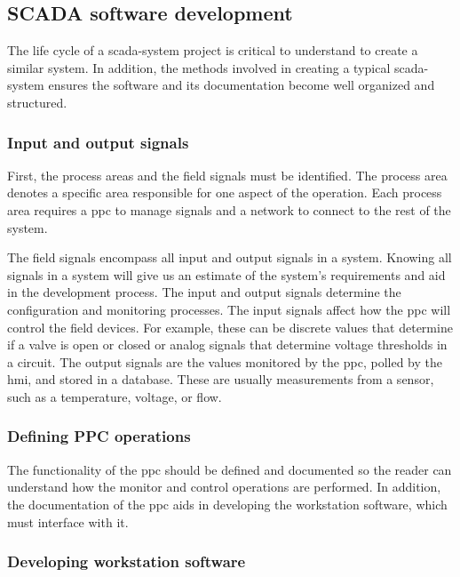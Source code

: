 \documentclass[main.tex]{subfiles}
\begin{document}
\subsection{SCADA software development}

The life cycle of a \gls{scada}-system project is critical to understand to create a similar system. In addition, the methods involved in creating a typical \gls{scada}-system ensures the software and its documentation become well organized and structured.


\subsubsection{Input and output signals}

 First, the process areas and the field signals must be identified. The process area denotes a specific area responsible for one aspect of the operation. Each process area requires a \gls{ppc} to manage signals and a network to connect to the rest of the system.

The field signals encompass all input and output signals in a system. Knowing all signals in a system will give us an estimate of the system's requirements and aid in the development process. The input and output signals determine the configuration and monitoring processes. The input signals affect how the \gls{ppc} will control the field devices. For example, these can be discrete values that determine if a valve is open or closed or analog signals that determine voltage thresholds in a circuit. The output signals are the values monitored by the \gls{ppc}, polled by the \gls{hmi}, and stored in a database. These are usually measurements from a sensor, such as a temperature, voltage, or flow.


\subsubsection{Defining PPC operations}

The functionality of the \gls{ppc} should be defined and documented so the reader can understand how the monitor and control operations are performed. In addition, the documentation of the \gls{ppc} aids in developing the workstation software, which must interface with it.

\subsubsection{Developing workstation software}
\end{document}
